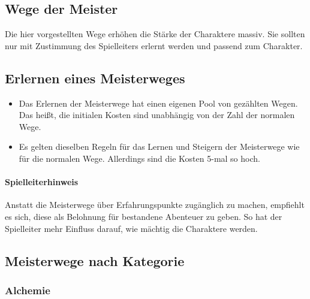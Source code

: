 \documentclass{article}
\begin{document}
\begin{center}
\section{Wege der Meister}
\end{center}

Die hier vorgestellten Wege erhöhen die Stärke der Charaktere massiv. Sie sollten nur mit Zustimmung des Spielleiters
erlernt werden und passend zum Charakter.

\begin{center}
\subsection{Erlernen eines Meisterweges}
\end{center}

\begin{itemize}
\item Das Erlernen der Meisterwege hat einen eigenen Pool von gezählten Wegen. Das heißt, die initialen Kosten sind unabhängig von der Zahl der normalen Wege.
\item Es gelten dieselben Regeln für das Lernen und Steigern der Meisterwege wie für die normalen Wege. Allerdings sind die Kosten 5-mal so hoch.
\end{itemize}

\begin{mdframed}[hidealllines=true, backgroundcolor=black!10]
\paragraph{Spielleiterhinweis}

Anstatt die Meisterwege über Erfahrungspunkte zugänglich zu machen, empfiehlt es sich, diese als Belohnung für
bestandene Abenteuer zu geben. So hat der Spielleiter mehr Einfluss darauf, wie mächtig die Charaktere werden.

\end{mdframed}
\begin{center}
\subsection{Meisterwege nach Kategorie}
\end{center}

\subsubsection{Alchemie}
\end{document}
